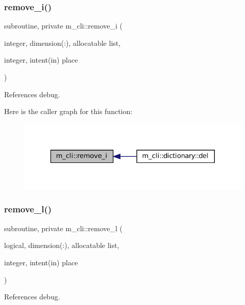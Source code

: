 \subsubsection{\texorpdfstring{remove\+\_\+i()}{remove\_i()}}
{\footnotesize\ttfamily subroutine, private m\+\_\+cli\+::remove\+\_\+i (\begin{DoxyParamCaption}\item[{integer, dimension(\+:), allocatable}]{list,  }\item[{integer, intent(in)}]{place }\end{DoxyParamCaption})\hspace{0.3cm}{\ttfamily [private]}}



References debug.

Here is the caller graph for this function\+:
\nopagebreak
\begin{figure}[H]
\begin{center}
\leavevmode
\includegraphics[width=329pt]{namespacem__cli_afa08d3d87184a6dd68a124231e536c93_icgraph}
\end{center}
\end{figure}
\mbox{\label{namespacem__cli_a9c86f0f52ce71f14e774fd21f0686cf6}} 
\subsubsection{\texorpdfstring{remove\+\_\+l()}{remove\_l()}}
{\footnotesize\ttfamily subroutine, private m\+\_\+cli\+::remove\+\_\+l (\begin{DoxyParamCaption}\item[{logical, dimension(\+:), allocatable}]{list,  }\item[{integer, intent(in)}]{place }\end{DoxyParamCaption})\hspace{0.3cm}{\ttfamily [private]}}



References debug.

